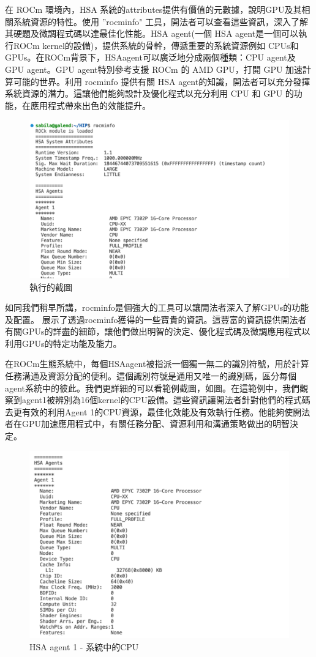 在 ROCm 環境內，HSA 系統的attributes提供有價值的元數據，說明GPU及其相關系統資源的特性。使用 ”rocminfo" 工具，開法者可以查看這些資訊，深入了解其硬題及微調程式碼以達最佳化性能。HSA agent(一個 HSA agent是一個可以執行ROCm kernel的設備)，提供系統的骨幹，傳遞重要的系統資源例如 CPUs和GPUs。在ROCm背景下，HSAagent可以廣泛地分成兩個種類：CPU agent及 GPU agent。GPU agent特別參考支援 ROCm 的 AMD GPU，打開 GPU 加速計算可能的世界。利用 rocminfo 提供有關 HSA agent的知識，開法者可以充分發揮系統資源的潛力。這讓他們能夠設計及優化程式以充分利用 CPU 和 GPU 的功能，在應用程式帶來出色的效能提升。

\begin{figure}
    \centering
    \includegraphics[width=0.75\linewidth]{FileAusiliari/Screenshots/Figure7-1.png}
    \caption{執行的截圖}
    \label{fig:rocminfo}
\end{figure}

如同我們稍早所講，rocminfo是個強大的工具可以讓開法者深入了解GPUs的功能及配置。 展示了透過rocminfo獲得的一些寶貴的資訊。這豐富的資訊提供開法者有關GPUs的詳盡的細節，讓他們做出明智的決定、優化程式碼及微調應用程式以利用GPUs的特定功能及能力。

在ROCm生態系統中，每個HSAagent被指派一個獨一無二的識別符號，用於計算任務溝通及資源分配的便利。這個識別符號是通用又唯一的識別碼，區分每個agent系統中的彼此。我們更詳細的可以看範例截圖，如圖。在這範例中，我們觀察到agent1被辨別為16個kernel的CPU設備。這些資訊讓開法者針對他們的程式碼去更有效的利用Agent 1的CPU資源，最佳化效能及有效執行任務。他能夠使開法者在GPU加速應用程式中，有關任務分配、資源利用和溝通策略做出的明智決定。

\begin{figure}
    \centering
    \includegraphics[width=0.75\linewidth]{FileAusiliari/Screenshots/Figure7-2.png}
    \caption{HSA agent 1 - 系統中的CPU}
    \label{fig:HSA agent 1}
\end{figure}

